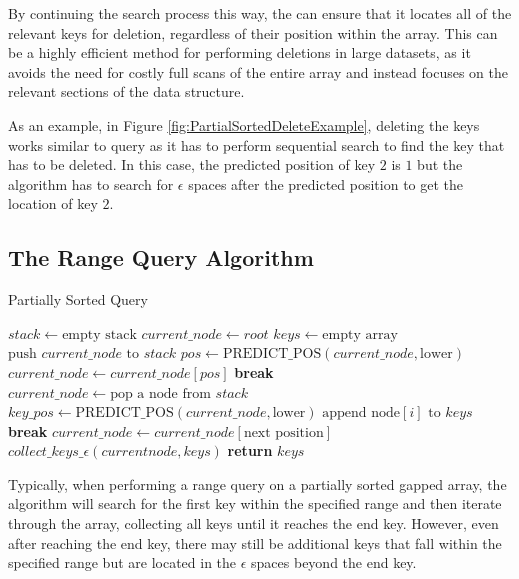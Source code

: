 By continuing the search process this way, the \learnindex can ensure that it locates all of the relevant keys for deletion, regardless of their position within the array. This can be a highly efficient method for performing deletions in large datasets, as it avoids the need for costly full scans of the entire array and instead focuses on the relevant sections of the data structure.

As an example, in Figure \ref{fig:PartialSortedDeleteExample}, deleting the keys works similar to query as it has to perform sequential search to find the key that has to be deleted. In this case, the predicted position of key $2$ is $1$ but the algorithm has to search for $\epsilon$ spaces after the predicted position to get the location of key $2$.
\subsection{The Range Query Algorithm}
\begin{algorithm}

\caption{Partially Sorted Query}
\begin{algorithmic}[1]

  \State $stack \gets \text{empty stack}$
  \State $current\_node \gets root$
  \State $keys \gets \text{empty array}$
      \State $\text{push } current\_node \text{ to } stack$
      \State $pos \gets \text{PREDICT\_POS}(current\_node, \text{lower})$
        \State $current\_node \gets current\_node[pos]$
      \Else
        \State \textbf{break}
      \EndIf
    \EndWhile
      \State $current\_node \gets \text{pop a node from } stack$
      \State $key\_pos \gets \text{PREDICT\_POS}(current\_node, \text{lower})$
          \State $\text{append } \text{node}[i] \text{ to } keys$
        \Else
          \State \textbf{break}
        \EndIf
      \EndFor
      \State $current\_node \gets current\_node[\text{next position}]$
    \EndIf
  \EndWhile
  \State $collect\_keys\_\epsilon(current node, keys)$
  \State \textbf{return} $keys$
\EndProcedure
\end{algorithmic}
\end{algorithm}
Typically, when performing a range query on a partially sorted gapped array, the algorithm will search for the first key within the specified range and then iterate through the array, collecting all keys until it reaches the end key. However, even after reaching the end key, there may still be additional keys that fall within the specified range but are located in the $\epsilon$ spaces beyond the end key.

